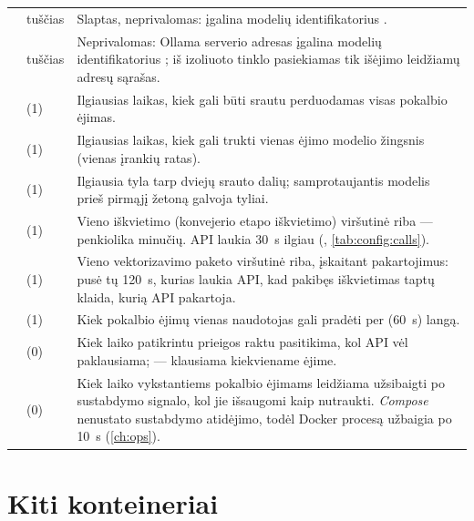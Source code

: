 \begin{xltabular}{\textwidth}{@{}L{38mm}L{40mm}Y@{}}
 & tuščias & Slaptas, neprivalomas: įgalina modelių identifikatorius . \\
 & tuščias & Neprivalomas: Ollama serverio adresas įgalina modelių identifikatorius ; iš izoliuoto tinklo pasiekiamas tik išėjimo leidžiamų adresų sąrašas. \\
 &  (1) & Ilgiausias laikas, kiek gali būti srautu perduodamas visas pokalbio ėjimas. \\
 &  (1) & Ilgiausias laikas, kiek gali trukti vienas ėjimo modelio žingsnis (vienas įrankių ratas). \\
 &  (1) & Ilgiausia tyla tarp dviejų srauto dalių; samprotaujantis modelis prieš pirmąjį žetoną galvoja tyliai. \\
 &  (1) & Vieno  iškvietimo (konvejerio etapo iškvietimo) viršutinė riba --- penkiolika minučių. API laukia 30~s ilgiau (, \cref{tab:config:calls}). \\
 &  (1) & Vieno vektorizavimo paketo viršutinė riba, įskaitant pakartojimus: pusė tų 120~s, kurias laukia API, kad pakibęs iškvietimas taptų klaida, kurią API pakartoja. \\
 &  (1) & Kiek pokalbio ėjimų vienas naudotojas gali pradėti per  (60~s) langą. \\
 &  (0) & Kiek laiko patikrintu prieigos raktu pasitikima, kol API vėl paklausiama;  --- klausiama kiekviename ėjime. \\
 &  (0) & Kiek laiko vykstantiems pokalbio ėjimams leidžiama užsibaigti po sustabdymo signalo, kol jie išsaugomi kaip nutraukti. \textit{Compose} nenustato sustabdymo atidėjimo, todėl Docker procesą užbaigia po 10~s (\cref{ch:ops}). \\
\end{xltabular}


\section{Kiti konteineriai}\label{sec:config:other}

